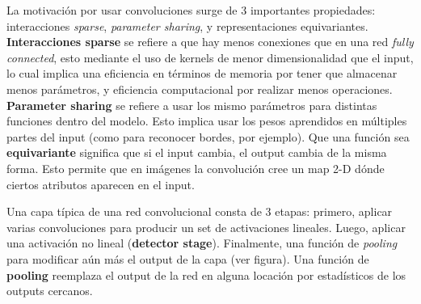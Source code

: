 
La motivaci\'on por usar convoluciones surge de 3 importantes propiedades: interacciones \textit{sparse}, \textit{parameter sharing}, y representaciones equivariantes. \textbf{Interacciones sparse} se refiere a que hay menos conexiones que en una red \textit{fully connected}, esto mediante el uso de kernels de menor dimensionalidad que el input, lo cual implica una eficiencia en t\'erminos de memoria por tener que almacenar menos par\'ametros, y eficiencia computacional por realizar menos operaciones. \textbf{Parameter sharing} se refiere a usar los mismo par\'ametros para distintas funciones dentro del modelo. Esto implica usar los pesos aprendidos en m\'ultiples partes del input (como para reconocer bordes, por ejemplo). Que una funci\'on sea \textbf{equivariante} significa que si el input cambia, el output cambia de la misma forma. Esto permite que en im\'agenes la convoluci\'on cree un map 2-D d\'onde ciertos atributos aparecen en el input.

Una capa t\'ipica de una red convolucional consta de 3 etapas: primero, aplicar varias convoluciones para producir un set de activaciones lineales. Luego, aplicar una activaci\'on no lineal (\textbf{detector stage}). Finalmente, una funci\'on de \textit{pooling} para modificar a\'un m\'as el output de la capa (ver figura). Una funci\'on de \textbf{pooling} reemplaza el output de la red en alguna locaci\'on por estad\'isticos de los outputs cercanos. 

